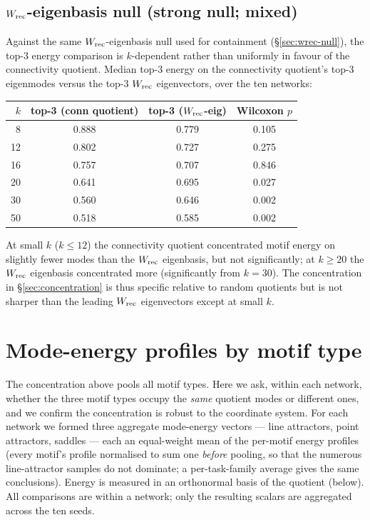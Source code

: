 \documentclass[11pt]{article}
\begin{document}
\subsection{$W_{\rm rec}$-eigenbasis null (strong null; mixed)}
Against the same $W_{\rm rec}$-eigenbasis null used for containment (\S\ref{sec:wrec-null}), the
top-3 energy comparison is $k$-dependent rather than uniformly in favour of the connectivity
quotient. Median top-3 energy on the connectivity quotient's top-3 eigenmodes versus the top-3
$W_{\rm rec}$ eigenvectors, over the ten networks:
\begin{center}\small
\begin{tabular}{rccc}
\toprule
$k$ & top-3 (conn quotient) & top-3 ($W_{\rm rec}$-eig) & Wilcoxon $p$ \\
\midrule
8  & 0.888 & 0.779 & 0.105 \\
12 & 0.802 & 0.727 & 0.275 \\
16 & 0.757 & 0.707 & 0.846 \\
20 & 0.641 & 0.695 & 0.027 \\
30 & 0.560 & 0.646 & 0.002 \\
50 & 0.518 & 0.585 & 0.002 \\
\bottomrule
\end{tabular}
\end{center}
At small $k$ ($k\leq12$) the connectivity quotient concentrated motif energy on slightly fewer
modes than the $W_{\rm rec}$ eigenbasis, but not significantly; at $k\geq20$ the $W_{\rm rec}$
eigenbasis concentrated more (significantly from $k=30$). The concentration in
\S\ref{sec:concentration} is thus specific relative to random quotients but is not sharper than
the leading $W_{\rm rec}$ eigenvectors except at small $k$.

\section{Mode-energy profiles by motif type}
\label{sec:typeprofiles}
The concentration above pools all motif types. Here we ask, within each network, whether the three
motif types occupy the \emph{same} quotient modes or different ones, and we confirm the
concentration is robust to the coordinate system. For each network we formed three aggregate
mode-energy vectors --- line attractors, point attractors, saddles --- each an equal-weight mean of
the per-motif energy profiles (every motif's profile normalised to sum one \emph{before} pooling,
so that the numerous line-attractor samples do not dominate; a per-task-family average gives the
same conclusions). Energy is measured in an orthonormal basis of the quotient (below). All
comparisons are within a network; only the resulting scalars are aggregated across the ten seeds.
\end{document}
